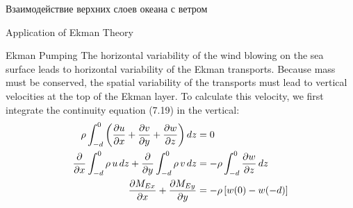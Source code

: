 \begin{chapter}{Взаимодействие верхних слоев океана с ветром}
\begin{section}{Application of Ekman Theory}
\begin{paragraph}{Ekman Pumping}
The horizontal variability of the wind blowing
on the sea surface leads to horizontal variability of the Ekman
transports. Because mass must be conserved, the spatial variability of
the transports must lead to vertical velocities at the top of the
Ekman layer. To calculate this velocity, we first integrate the
continuity equation (7.19) in the vertical:
\begin{equation}
\begin{aligned}
  \rho\int_{-d}^0 
    \left( \frac{\partial{u}}{\partial{x}} +\frac{\partial{v}}{\partial{y}}
           +\frac{\partial{w}}{\partial{z}} \right) dz 
     &=0 \notag \\
  \frac{\partial}{\partial{x}}\int_{-d}^0 \rho\,u\,dz 
           +\frac{\partial}{\partial{y}}\int_{-d}^0\rho\,v\,dz
     &=- \rho \int_{-d}^0 \frac{\partial{w}}{\partial{z}}\, dz \notag \\
  \frac{\partial{M_{Ex}}}{\partial{x}}+\frac{\partial{M_{Ey}}}{\partial{y}} 
     &=-\rho \left[ w(0)-w(-d)\right]
\end{aligned}
\end{equation}
%


\end{paragraph}
\end{section}
\end{chapter}
